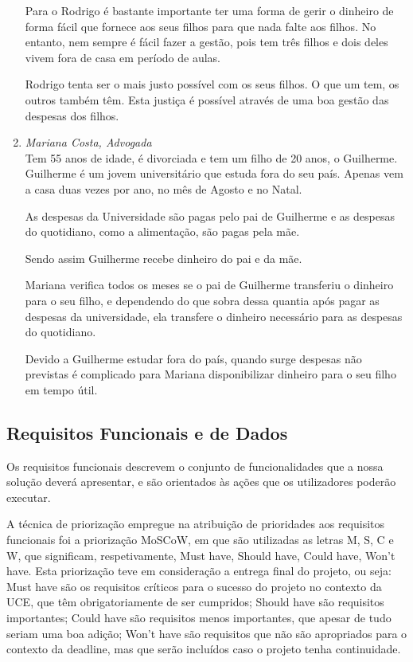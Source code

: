 \documentclass{article}
\begin{document}
\begin{enumerate}
            Para o Rodrigo é bastante importante ter uma forma de gerir o dinheiro de forma fácil que fornece aos seus filhos para que nada falte aos filhos. No entanto, nem sempre é fácil fazer a gestão, pois tem três filhos e dois deles vivem fora de casa em período de aulas.

            Rodrigo tenta ser o mais justo possível com os seus filhos. O que um tem, os outros também têm. Esta justiça é possível através de uma boa gestão das despesas dos filhos.

      \item \emph{Mariana Costa, Advogada}\\
            Tem 55 anos de idade, é divorciada e tem um filho de 20 anos, o Guilherme. Guilherme é um jovem universitário que estuda fora do seu país. Apenas vem a casa duas vezes por ano, no mês de Agosto e no Natal.

            As despesas da Universidade são pagas pelo pai de Guilherme e as despesas do quotidiano, como a alimentação, são pagas pela mãe.

            Sendo assim Guilherme recebe dinheiro do pai e da mãe.

            Mariana verifica todos os meses se o pai de Guilherme transferiu o dinheiro para o seu filho, e dependendo do que sobra dessa quantia após pagar as despesas da universidade, ela transfere o dinheiro necessário para as despesas do quotidiano.

            Devido a Guilherme estudar fora do país, quando surge despesas não previstas é complicado para Mariana disponibilizar dinheiro para o seu filho em tempo útil.

    \end{enumerate}

  \subsection{Requisitos Funcionais e de Dados}

    Os requisitos funcionais descrevem o conjunto de funcionalidades que a nossa solução deverá apresentar, e são orientados às ações que os utilizadores poderão executar.

    A técnica de priorização empregue na atribuição de prioridades aos requisitos funcionais foi a priorização MoSCoW, em que são utilizadas as letras M, S, C e W, que significam, respetivamente, Must have, Should have, Could have, Won’t have. Esta priorização teve em consideração a entrega final do projeto, ou seja: Must have são os requisitos críticos para o sucesso do projeto no contexto da UCE, que têm obrigatoriamente de ser cumpridos; Should have são requisitos importantes; Could have são requisitos menos importantes, que apesar de tudo seriam uma boa adição; Won’t have são requisitos que não são apropriados para o contexto da deadline, mas que serão incluídos caso o projeto tenha continuidade.
\end{document}
